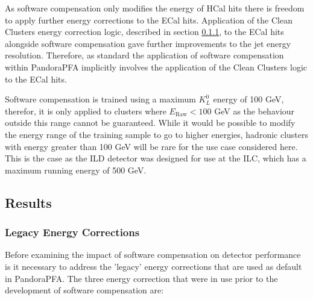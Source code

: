 As software compensation only modifies the energy of HCal hits there is freedom to apply further energy corrections to the ECal hits.  Application of the Clean Clusters energy correction logic, described in section \ref{sec:legacycorrections}, to the ECal hits alongside software compensation gave further improvements to the jet energy resolution.  Therefore, as standard the application of software compensation within PandoraPFA implicitly involves the application of the Clean Clusters logic to the ECal hits.  

Software compensation is trained using a maximum $K^{0}_{L}$ energy of 100 GeV, therefor, it is only applied to clusters where $E_{\text{Raw}} < 100$ GeV as the behaviour outside this range cannot be guaranteed.  While it would be possible to modify the energy range of the training sample to go to higher energies, hadronic clusters with energy greater than 100 GeV will be rare for the use case considered here.  This is the case as the ILD detector was designed for use at the ILC, which has a maximum running energy of 500 GeV.  


\subsection{Results}


\subsubsection{Legacy Energy Corrections}
\label{sec:legacycorrections}
Before examining the impact of software compensation on detector performance is it necessary to address the 'legacy' energy corrections that are used as default in PandoraPFA.  The three energy correction that were in use prior to the development of software compensation are:

